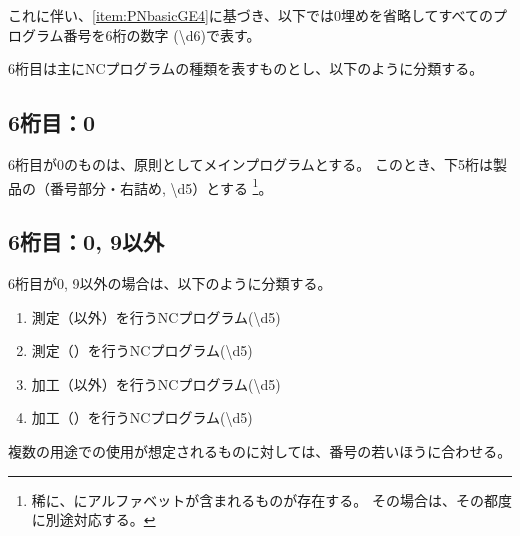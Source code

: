 これに伴い、\ref{item:PNbasicGE4}に基づき、以下では0埋めを省略してすべてのプログラム番号を6桁の数字 ({\ttfamily\textbackslash d{6}})で表す。


\clearpage
6桁目は主にNCプログラムの種類を表すものとし、以下のように分類する。

\subsection{6桁目：0}
6桁目が0のものは、原則としてメインプログラムとする。
このとき、下5桁は製品の\DrawingNumber（番号部分・右詰め, {\ttfamily\textbackslash d{5}}）とする
\footnote{稀に、\DrawingNumber にアルファベットが含まれるものが存在する。
その場合は、その都度に別途対応する。}。

\subsection{6桁目：0, 9以外}
6桁目が0, 9以外の場合は、以下のように分類する。
\begin{enumerate}[label=\arabic*., ref=\arabic*, start=1]
\item\label{item:6Mmain} 測定（\Dimple 以外）を行うNCプログラム({\textbackslash d{5}})
\item\label{item:6MD} 測定（\Dimple）を行うNCプログラム({\textbackslash d{5}})
\setcounter{enumi}{3}
\item\label{item:6Kmain} 加工（\Dimple 以外）を行うNCプログラム({\textbackslash d{5}})
\item\label{item:6KD} 加工（\Dimple）を行うNCプログラム({\textbackslash d{5}})
\end{enumerate}
複数の用途での使用が想定されるものに対しては、番号の若いほうに合わせる。



